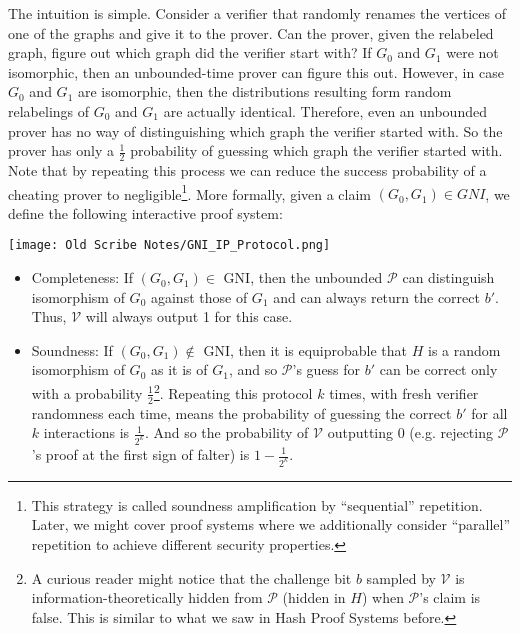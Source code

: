 The intuition is simple. Consider a verifier that randomly renames the vertices of one of the graphs and give it to the prover. Can the prover, given the relabeled graph, figure out which graph did the verifier start with?  If $G_0$ and $G_1$ were not isomorphic, then an unbounded-time prover can figure this out. However, in case $G_0$ and $G_1$ {are} isomorphic, then the distributions resulting form random relabelings of $G_0$ and $G_1$ are actually identical. Therefore, even an unbounded prover has no way of distinguishing which graph the verifier started with. So the prover has only a $\frac12$ probability of guessing which graph the verifier started with. Note that by repeating this process we can reduce the success probability of a cheating prover to negligible\footnote{This strategy is called soundness amplification by ``sequential'' repetition. Later, we might cover proof systems where we additionally consider ``parallel'' repetition to achieve different security properties.}. More formally, given a claim $(G_0,G_1)\in GNI$, we define the following interactive proof system:


		\begin{center}
			\texttt{[image: Old Scribe Notes/GNI\_IP\_Protocol.png]}
		\end{center}

		\begin{itemize}
			\item Completeness: If $(G_0,G_1)\in$ GNI, then the unbounded $\mathcal{P}$ can distinguish isomorphism of $G_0$ against those of $G_1$ and can always return the correct $b'$.  Thus, $\mathcal{V}$ will always output 1 for this case.
			\item Soundness: If $(G_0,G_1)\notin$ GNI, then it is equiprobable that $H$ is a random isomorphism of $G_0$ as it is of $G_1$, and so $\mathcal{P}$'s guess for $b'$ can be correct only with a probability $\frac{1}{2}$\footnote{A curious reader might notice that the challenge bit $b$ sampled by $\mathcal{V}$ is information-theoretically hidden from $\mathcal{P}$ (hidden in $H$) when $\mathcal{P}$'s claim is false. This is similar to what we saw in Hash Proof Systems before.}.  Repeating this protocol $k$ times, with fresh verifier randomness each time, means the probability of guessing the correct $b'$ for all $k$ interactions is $\frac{1}{2^k}$.  And so the probability of $\mathcal{V}$ outputting 0 (e.g. rejecting $\mathcal{P}$'s proof at the first sign of falter) is $1-\frac{1}{2^k}$.  

		\end{itemize}

